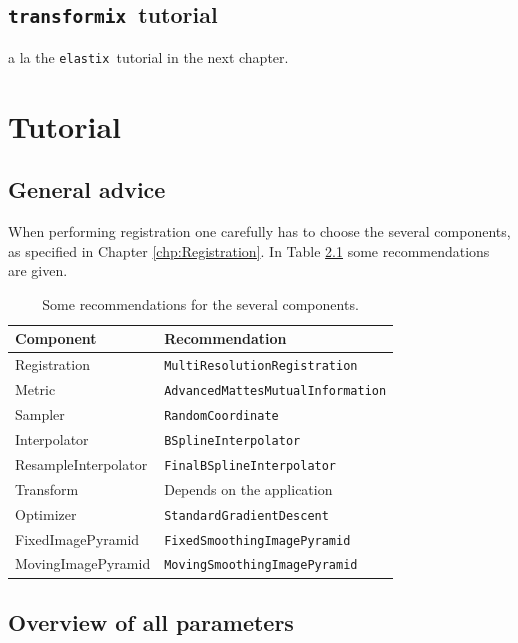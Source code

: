 \documentclass[]{report}
\newcommand{\elastix}{\texttt{elastix}}
\newcommand{\transformix}{\texttt{transformix}}
\begin{document}
\section{\transformix\ tutorial}

a la the \elastix\ tutorial in the next chapter.


\chapter{Tutorial}\label{chp:Tutorial}


\section{General advice}

When performing registration one carefully has to choose the several
components, as specified in Chapter \ref{chp:Registration}. In Table
\ref{table:tutorial:components} some recommendations are given.

\begin{table}[htb]
\centering
\begin{tabular}{l|l}
\textbf{Component} & \textbf{Recommendation} \\
\hline
Registration & \texttt{MultiResolutionRegistration} \\
Metric       & \texttt{AdvancedMattesMutualInformation} \\
Sampler      & \texttt{RandomCoordinate} \\
Interpolator & \texttt{BSplineInterpolator} \\
ResampleInterpolator & \texttt{FinalBSplineInterpolator} \\
Transform    & Depends on the application \\
Optimizer    & \texttt{StandardGradientDescent} \\
FixedImagePyramid   & \texttt{FixedSmoothingImagePyramid} \\
MovingImagePyramid  & \texttt{MovingSmoothingImagePyramid} \\
\end{tabular}
\caption{Some recommendations for the several components.}\label{table:tutorial:components}
\end{table}

\section{Overview of all parameters}
\end{document}
